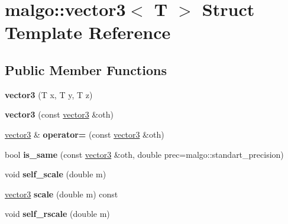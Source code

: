 \hypertarget{structmalgo_1_1vector3}{}\section{malgo\+:\+:vector3$<$ T $>$ Struct Template Reference}
\label{structmalgo_1_1vector3}
\subsection*{Public Member Functions}
\begin{DoxyCompactItemize}
\item 
{\bfseries vector3} (T x, T y, T z)\hypertarget{structmalgo_1_1vector3_a9471dbc892e19a605691c10b91dacab1}{}\label{structmalgo_1_1vector3_a9471dbc892e19a605691c10b91dacab1}

\item 
{\bfseries vector3} (const \hyperlink{structmalgo_1_1vector3}{vector3} \&oth)\hypertarget{structmalgo_1_1vector3_adb6df778ca4c112bc8486377b35ed769}{}\label{structmalgo_1_1vector3_adb6df778ca4c112bc8486377b35ed769}

\item 
\hyperlink{structmalgo_1_1vector3}{vector3} \& {\bfseries operator=} (const \hyperlink{structmalgo_1_1vector3}{vector3} \&oth)\hypertarget{structmalgo_1_1vector3_ab9568acce862ac10e12aa14c6f686ff1}{}\label{structmalgo_1_1vector3_ab9568acce862ac10e12aa14c6f686ff1}

\item 
bool {\bfseries is\+\_\+same} (const \hyperlink{structmalgo_1_1vector3}{vector3} \&oth, double prec=malgo\+::standart\+\_\+precision)\hypertarget{structmalgo_1_1vector3_a8fcdea3c4e348c39d6bf565a26042735}{}\label{structmalgo_1_1vector3_a8fcdea3c4e348c39d6bf565a26042735}

\item 
void {\bfseries self\+\_\+scale} (double m)\hypertarget{structmalgo_1_1vector3_aaa544e5cc41bf7f0fb9cf555f124757d}{}\label{structmalgo_1_1vector3_aaa544e5cc41bf7f0fb9cf555f124757d}

\item 
\hyperlink{structmalgo_1_1vector3}{vector3} {\bfseries scale} (double m) const \hypertarget{structmalgo_1_1vector3_a75a22694a128cf4f3b082c15f2811249}{}\label{structmalgo_1_1vector3_a75a22694a128cf4f3b082c15f2811249}

\item 
void {\bfseries self\+\_\+rscale} (double m)\hypertarget{structmalgo_1_1vector3_a9e7c0683b4012ea3cc09421958bd2872}{}\label{structmalgo_1_1vector3_a9e7c0683b4012ea3cc09421958bd2872}


\end{DoxyCompactItemize}
